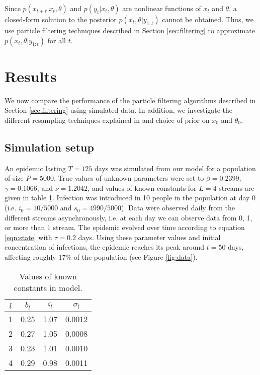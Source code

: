 \documentclass{elsarticle}
\begin{document}
Since $p(x_{t+\tau}|x_t,\theta)$ and $p(y_t|x_t,\theta)$ are nonlinear functions of $x_t$ and $\theta$, a closed-form solution to the posterior $p(x_t,\theta|y_{1:t})$ cannot be obtained.  Thus, we use particle filtering techniques described in Section \ref{sec:filtering} to approximate $p(x_t,\theta|y_{1:t})$ for all $t$.

\section{Results} \label{sec:results}

We now compare the performance of the particle filtering algorithms described in Section \ref{sec:filtering} using simulated data.  In addition, we investigate the different resampling techniques explained in \citet{Douc:Capp:Moul:comp:2005} and choice of prior on $x_0$ and $\theta_0$.

\subsection{Simulation setup} \label{sec:sim}

An epidemic lasting $T = 125$ days was simulated from our model for a population of size $P = 5000$.  True values of unknown parameters were set to $\beta = 0.2399$, $\gamma = 0.1066$, and $\nu = 1.2042$, and values of known constants for $L = 4$ streams are given in table \ref{tab:true}.  Infection was introduced in 10 people in the population at day 0 (i.e. $i_0 = 10/5000$ and $s_0 = 4990/5000$).  Data were observed daily from the different streams asynchronously, i.e. at each day we can observe data from 0, 1, or more than 1 stream.  The epidemic evolved over time according to equation \eqref{eqn:state} with $\tau = 0.2$ days.  Using these parameter values and initial concentration of infections, the epidemic reaches its peak around $t = 50$ days, affecting roughly 17\% of the population (see Figure \ref{fig:data}).

\begin{table}[ht]
\begin{center}
\caption{Values of known constants in model.}
\label{tab:true}
\begin{tabular}{|cccc|}
\hline
$l$ & $b_l$ & $\varsigma_l$ & $\sigma_l$ \\
\hline
1 & 0.25 & 1.07 & 0.0012 \\
2 & 0.27 & 1.05 & 0.0008 \\
3 & 0.23 & 1.01 & 0.0010 \\
4 & 0.29 & 0.98 & 0.0011 \\
\hline
\end{tabular}
\end{center}
\end{table}
\end{document}
